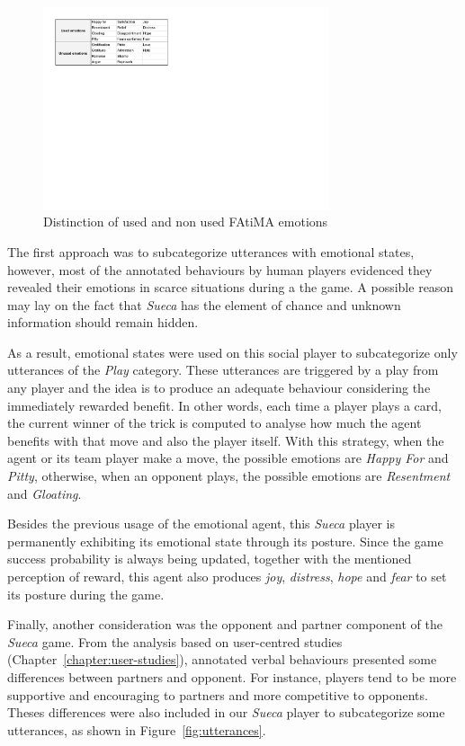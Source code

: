 \begin{figure}[ht]
	\centering
    \includegraphics[width=0.75\textwidth]{./img/6/emotions}
	\caption{Distinction of used and non used FAtiMA emotions}
\label{fig:emotions}
\end{figure}

The first approach was to subcategorize utterances with emotional states, however, most of the annotated behaviours by human players evidenced they revealed their emotions in scarce situations during a the game.
A possible reason may lay on the fact that \emph{Sueca} has the element of chance and unknown information should remain hidden.

As a result, emotional states were used on this social player to subcategorize only utterances of the \emph{Play} category.
These utterances are triggered by a play from any player and the idea is to produce an adequate behaviour considering the immediately rewarded benefit.
In other words, each time a player plays a card, the current winner of the trick is computed to analyse how much the agent benefits with that move and also the player itself.
With this strategy, when the agent or its team player make a move, the possible emotions are \emph{Happy For} and \emph{Pitty}, otherwise, when an opponent plays, the possible emotions are \emph{Resentment} and \emph{Gloating}.

Besides the previous usage of the emotional agent, this \emph{Sueca} player is permanently exhibiting its emotional state through its posture.
Since the game success probability is always being updated, together with the mentioned perception of reward, this agent also produces \emph{joy}, \emph{distress}, \emph{hope} and \emph{fear} to set its posture during the game.

Finally, another consideration was the opponent and partner component of the \emph{Sueca} game.
From the analysis based on user-centred studies (Chapter~\ref{chapter:user-studies}), annotated verbal behaviours presented some differences between partners and opponent.
For instance, players tend to be more supportive and encouraging to partners and more competitive to opponents.
Theses differences were also included in our \emph{Sueca} player to subcategorize some utterances, as shown in Figure~\ref{fig:utterances}.


